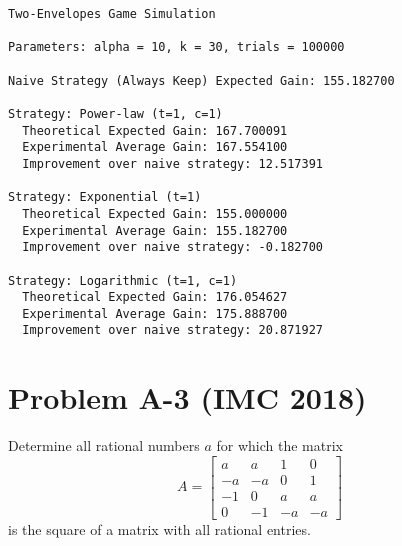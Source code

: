 \documentclass[11pt, a4paper, oneside]{article}
\newcommand{\problem}[1][]{\section{#1} \hfill \par}
\theoremstyle{remark}
\theoremstyle{lemma}
\begin{document}
\begin{lstlisting}
Two-Envelopes Game Simulation

Parameters: alpha = 10, k = 30, trials = 100000

Naive Strategy (Always Keep) Expected Gain: 155.182700

Strategy: Power-law (t=1, c=1)
  Theoretical Expected Gain: 167.700091
  Experimental Average Gain: 167.554100
  Improvement over naive strategy: 12.517391

Strategy: Exponential (t=1)
  Theoretical Expected Gain: 155.000000
  Experimental Average Gain: 155.182700
  Improvement over naive strategy: -0.182700

Strategy: Logarithmic (t=1, c=1)
  Theoretical Expected Gain: 176.054627
  Experimental Average Gain: 175.888700
  Improvement over naive strategy: 20.871927
\end{lstlisting}
\newpage

\problem[Problem A-3 (IMC 2018)]
Determine all rational numbers $a$ for which the matrix
\[
A = \begin{bmatrix}
    a & a & 1 & 0 \\
    -a & -a & 0 & 1 \\
    -1 & 0 & a & a \\
    0 & -1 & -a & -a
\end{bmatrix}
\]
is the square of a matrix with all rational entries.
\end{document}
